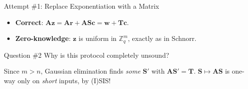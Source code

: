 \documentclass{zkdl-presentation-template}
\begin{document}
\begin{frame}{Attempt \#1: Replace Exponentiation with a Matrix}
        \vspace{5pt}
        \begin{itemize}
            \item \textbf{Correct}: $\mathbf{A}\mathbf{z} = \mathbf{A}\mathbf{r} + \mathbf{A}\mathbf{S}\mathbf{c} = \mathbf{w} + \mathbf{T}\mathbf{c}$. \cmark
            \item \textbf{Zero-knowledge}: $\mathbf{z}$ is uniform in $\mathbb{Z}_q^m$, exactly as in Schnorr. \cmark
        \end{itemize}
        \pause

        \begin{questionblock}{Question \#2}
            Why is this protocol completely unsound?
        \end{questionblock}
        \pause
        \vspace{-5pt}
        {\small Since $m > n$, Gaussian elimination finds \emph{some} $\mathbf{S}'$ with $\mathbf{A}\mathbf{S}' = \mathbf{T}$. $\mathbf{S} \mapsto \mathbf{A}\mathbf{S}$ is one-way only on \emph{short} inputs, by (I)SIS! \xmark}
    \end{frame}
\end{document}
